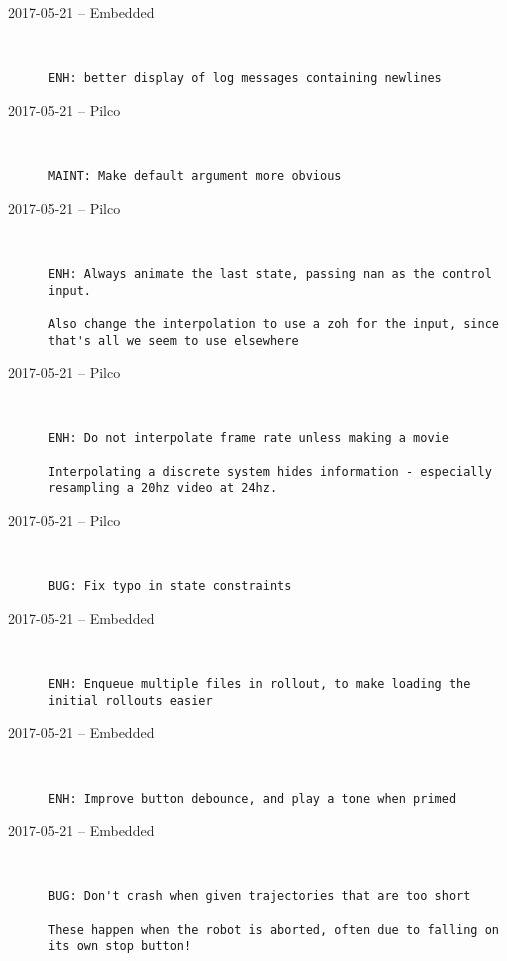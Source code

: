 \begin{description}
  \item[2017-05-21 -- Embedded] \hfill \
\begin{lstlisting}
ENH: better display of log messages containing newlines
\end{lstlisting}


  \item[2017-05-21 -- Pilco] \hfill \
\begin{lstlisting}
MAINT: Make default argument more obvious
\end{lstlisting}


  \item[2017-05-21 -- Pilco] \hfill \
\begin{lstlisting}
ENH: Always animate the last state, passing nan as the control input.

Also change the interpolation to use a zoh for the input, since that's all we seem to use elsewhere
\end{lstlisting}


  \item[2017-05-21 -- Pilco] \hfill \
\begin{lstlisting}
ENH: Do not interpolate frame rate unless making a movie

Interpolating a discrete system hides information - especially resampling a 20hz video at 24hz.
\end{lstlisting}


  \item[2017-05-21 -- Pilco] \hfill \
\begin{lstlisting}
BUG: Fix typo in state constraints
\end{lstlisting}


  \item[2017-05-21 -- Embedded] \hfill \
\begin{lstlisting}
ENH: Enqueue multiple files in rollout, to make loading the initial rollouts easier
\end{lstlisting}


  \item[2017-05-21 -- Embedded] \hfill \
\begin{lstlisting}
ENH: Improve button debounce, and play a tone when primed
\end{lstlisting}


  \item[2017-05-21 -- Embedded] \hfill \
\begin{lstlisting}
BUG: Don't crash when given trajectories that are too short

These happen when the robot is aborted, often due to falling on its own stop button!
\end{lstlisting}



\end{description}
